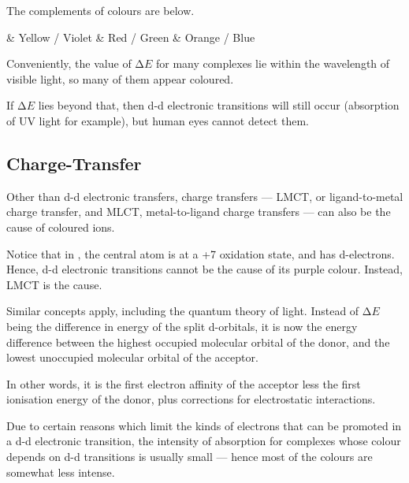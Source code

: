 				The complements of colours are below.

				\begin{bulletlist}
					& Yellow / Violet
					& Red / Green
					& Orange / Blue
				\end{bulletlist}

				Conveniently, the value of $∆E$ for many complexes lie within the wavelength of visible light, so many of them appear
				coloured.

				If $∆E$ lies beyond that, then d-d electronic transitions will still occur (absorption of UV light for example),
				but human eyes cannot detect them.




		\pagebreak
		\subsection{Charge-Transfer}

			Other than d-d electronic transfers, charge transfers --- LMCT, or ligand-to-metal charge transfer, and MLCT, metal-to-ligand
			charge transfers --- can also be the cause of coloured ions.

			Notice that in , the central  atom is at a +7 oxidation state, and has  d-electrons. Hence, d-d electronic
			transitions cannot be the cause of its  purple colour. Instead, LMCT is the cause.

			Similar concepts apply, including the quantum theory of light. Instead of $∆E$ being the difference in energy of the split
			d-orbitals, it is now the energy difference between the highest occupied molecular orbital of the donor, and the lowest unoccupied
			molecular orbital of the acceptor.

			In other words, it is the first electron affinity of the acceptor less the first ionisation energy of the donor, plus corrections
			for electrostatic interactions.


			Due to certain reasons which limit the kinds of electrons that can be promoted in a d-d electronic transition, the intensity of
			absorption for complexes whose colour depends on d-d transitions is usually small --- hence most of the colours are somewhat
			less intense.

